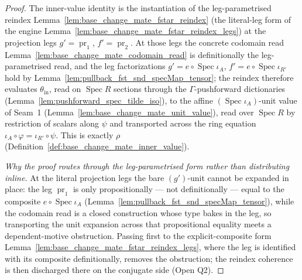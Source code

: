 \begin{proof}
  The inner-value identity is the instantiation of the leg-parametrised reindex
  Lemma~\ref{lem:base_change_mate_fstar_reindex} (the literal-leg form of the engine
  Lemma~\ref{lem:base_change_mate_fstar_reindex_legs}) at the projection legs
  \(g' = \operatorname{pr}_1\), \(f' = \operatorname{pr}_2\). At those legs the concrete codomain
  read Lemma~\ref{lem:base_change_mate_codomain_read} is definitionally the leg-parametrised read,
  and the leg factorizations \(g' = e \circ \operatorname{Spec}\iota_A\),
  \(f' = e \circ \operatorname{Spec}\iota_{R'}\) hold by
  Lemma~\ref{lem:pullback_fst_snd_specMap_tensor}; the reindex therefore evaluates
  \(\theta_{\mathrm{in}}\), read on \(\operatorname{Spec} R\) sections through the
  \(\Gamma\)-pushforward dictionaries (Lemma~\ref{lem:pushforward_spec_tilde_iso}), to the affine
  \((\operatorname{Spec}\iota_A)\)-unit value of Seam~1
  (Lemma~\ref{lem:base_change_mate_unit_value}), read over \(\operatorname{Spec} R\) by restriction
  of scalars along \(\psi\) and transported across the ring equation
  \(\iota_A \circ \varphi = \iota_{R'} \circ \psi\). This is exactly \(\rho\)
  (Definition~\ref{def:base_change_mate_inner_value}).

  \emph{Why the proof routes through the leg-parametrised form rather than distributing inline.} At
  the literal projection legs the bare \((g')\)-unit cannot be expanded in place: the leg
  \(\operatorname{pr}_1\) is only propositionally — not definitionally — equal to the composite
  \(e \circ \operatorname{Spec}\iota_A\) (Lemma~\ref{lem:pullback_fst_snd_specMap_tensor}), while
  the codomain read is a closed construction whose type bakes in the leg, so transporting the unit
  expansion across that propositional equality meets a dependent-motive obstruction. Passing first
  to the explicit-composite form Lemma~\ref{lem:base_change_mate_fstar_reindex_legs}, where the leg is
  identified with its composite definitionally, removes the obstruction; the reindex coherence is then
  discharged there on the conjugate side (Open Q2).
\end{proof}


